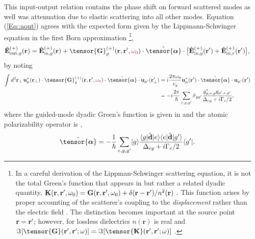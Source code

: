 \documentclass[preprint,aps,pra,onecolumn]{revtex4-1} %
\newcommand{\inp}{{\rm in}}
\newcommand{\out}{{\rm out}}
\newcommand{\poltens}{\hat{\tensor{\boldsymbol{\alpha}}}}
\newcommand{\comment}[1]{{\color{Maroon} #1}}
\begin{document}
This input-output relation contains the phase shift on forward scattered modes as well was attenuation due to elastic scattering into all other modes.
Equation (\ref{Eq::aout}) agrees with the expected form given by the Lippmann-Schwinger equation in the first Born approximation \footnote{In a careful derivation of the Lippman-Schwinger scattering equation, it is not the total Green's function that appears in  but rather a related dyadic quantity, $\mathbf{K}(\mathbf{r},\mathbf{r}', \omega_0) = \mathbf{G}(\mathbf{r},\mathbf{r}', \omega_0) + \delta(\mathbf{r}-\mathbf{r}')/n^2(\mathbf{r})$ \cite{wubs_multiple-scattering_2004}. This function arises by proper accounting of the scatterer's coupling to the \emph{displacement} rather than the electric field \cite{yao_ultrahigh_2009}.  The distinction becomes important at the source point $\mathbf{r} = \mathbf{r}'$; however, for lossless dielectrics $n(\mathbf{r})$ is real and $\Im[\tensor{\mathbf{G}}(\br',\br'; \omega)] = \Im[\tensor{\mathbf{K}}(\br',\br'; \omega)]$ \cite{yao_-chip_2010}. },
	\begin{equation} \label{Eq::IOScatteredField}
		\hat{\mathbf{E}}^{(+)}_{\out,g}(\br)=\hat{\mathbf{E}}^{(+)}_{ \inp, g}(\br)+\tensor{\mathbf{G}}_g^{(+)}(\br,\br',\comment{\omega_0})\cdot \poltens \cdot \big[\hat{\mathbf{E}}^{(+)}_{\inp, g}(\br')+\hat{\mathbf{E}}^{(+)}_{\inp,r}(\br') \big],
	\end{equation}
by noting
	\begin{align}
		\int d^2 \mbf{r}_\perp \, \mathbf{u}^*_{\mu} (\br_\perp)\cdot \tensor{\mathbf{G}}_g^{(+)}(\br,\br',\comment{\omega_0})\cdot \poltens \cdot \mathbf{u}_{\mu'} (\br'_\perp) &= i \frac{ 2\pi \omega_0}{v_g} \mathbf{u}^*_\mu (\br') \cdot \poltens \cdot \mathbf{u}_{\mu'} (\br') \\
		& = - i \frac{2 \pi}{\hbar} \sum_{e,g,g'}  \hat{\sigma}_{gg'} \frac{g_{\mu,e,g}^* g_{\mu',e,g'}}{ \Delta_{eg} + i \Gamma_{e}/2 }, 
	\end{align}
where the guided-mode dyadic Green's function is given in  and the atomic polarizability operator is \cite{buhmann_casimir-polder_2004, deutsch_quantum_2010,kien_dynamical_2013},
	\begin{equation} \label{Eq::PolarizabilityOperator}
		\poltens = - \frac{1}{\hbar} \sum_{e,g,g'}\ket{g}\frac{\bra{g}\hat{\mathbf{d}}\ket{e}\bra{e} 
\hat{\mathbf{d}}\ket{g'}}{\Delta_{eg} + i \Gamma_{e}/2 }\bra{g'}.
	\end{equation}	
\end{document}
